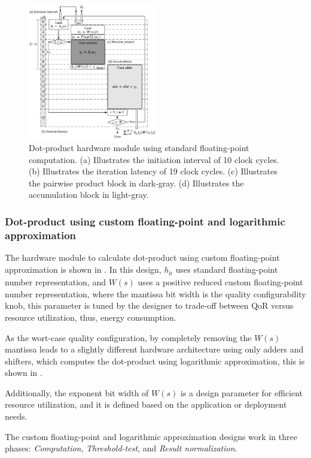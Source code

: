 \begin{figure}[t!]
	\centering
	\includegraphics[width=0.5\textwidth]{../figures/dot_product_float.pdf}
	\caption{Dot-product hardware module using standard floating-point computation. (a) Illustrates the initiation interval of 10 clock cycles. (b) Illustrates the iteration latency of 19 clock cycles. (c) Illustrates the pairwise product block in dark-gray. (d) Illustrates the accumulation block in light-gray.}
	\label{fig:dot_product_float}
\end{figure}

\subsubsection{Dot-product using custom floating-point and logarithmic approximation}
 The hardware module to calculate dot-product using custom floating-point approximation is shown in . In this design, $h_\mu$ uses standard floating-point number representation, and $W(s)$ uses a positive reduced custom floating-point number representation, where the mantissa bit width is the quality configurability knob, this parameter is tuned by the designer to trade-off between QoR versus resource utilization, thus, energy consumption.
 
 As the wort-case quality configuration, by completely removing the $W(s)$ mantissa leads to a slightly different hardware architecture using only adders and shifters, which computes the dot-product using logarithmic approximation, this is shown in .
 
Additionally, the exponent bit width of $W(s)$ is a design parameter for efficient resource utilization, and it is defined based on the application or deployment needs.
 
 The custom floating-point and logarithmic approximation designs work in three phases: \emph{Computation}, \emph{Threshold-test}, and \emph{Result normalization}.
 
